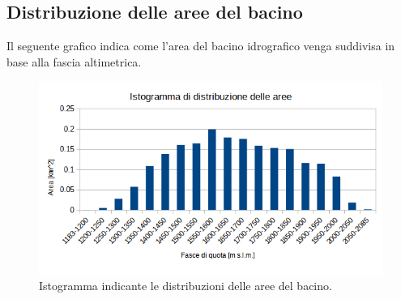 \subsection{Distribuzione delle aree del bacino}
Il seguente grafico indica come l'area del bacino idrografico venga suddivisa in base alla fascia altimetrica.
\begin{figure}[H] \centering
    \includegraphics[scale=0.8]{immagini/istogramma_distribuzione_aree.png}
    \caption{Istogramma indicante le distribuzioni delle aree del bacino.}
\end{figure}

